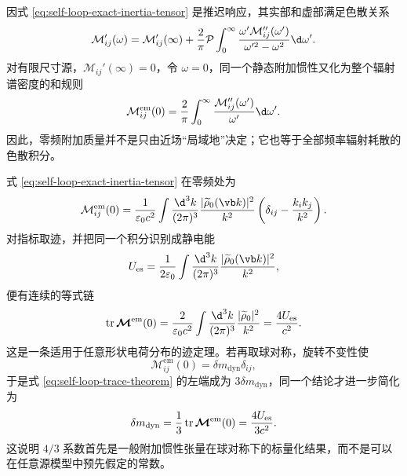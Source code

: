 因式 \eqref{eq:self-loop-exact-inertia-tensor} 是推迟响应，其实部和虚部满足色散关系
\begin{equation}
 \mathcal M_{ij}'(\omega)
 =\mathcal M_{ij}'(\infty)
 +{2\over\pi}\mathcal P\int_0^\infty
 {\omega'\mathcal M_{ij}''(\omega')\over\omega'^2-\omega^2}\d\omega'.
 \label{eq:self-loop-KK}
\end{equation}
对有限尺寸源，$\mathcal M_{ij}'(\infty)=0$，令 $\omega=0$，同一个静态附加惯性又化为整个辐射谱密度的和规则
\begin{equation}
 \mathcal M_{ij}^{\mathrm{em}}(0)
 ={2\over\pi}\int_0^\infty
 {\mathcal M_{ij}''(\omega')\over\omega'}\d\omega'.
 \label{eq:self-loop-added-mass-sum-rule}
\end{equation}
因此，零频附加质量并不是只由近场“局域地”决定；它也等于全部频率辐射耗散的色散积分。

式 \eqref{eq:self-loop-exact-inertia-tensor} 在零频处为
\begin{equation}
 \mathcal M_{ij}^{\mathrm{em}}(0)
 ={1\over\varepsilon_0c^2}
 \int{\d^3k\over(2\pi)^3}
 {|\widetilde\rho_0(\vb k)|^2\over k^2}
 \left(\delta_{ij}-{k_i k_j\over k^2}\right).
 \label{eq:self-loop-static-tensor}
\end{equation}
对指标取迹，并把同一个积分识别成静电能
\begin{equation*}
 U_{\mathrm{es}}
 ={1\over2\varepsilon_0}
 \int{\d^3k\over(2\pi)^3}{|\widetilde\rho_0(\vb k)|^2\over k^2},
\end{equation*}
便有连续的等式链
\begin{equation}
 \operatorname{tr}\boldsymbol{\mathcal M}^{\mathrm{em}}(0)
 ={2\over\varepsilon_0c^2}
 \int{\d^3k\over(2\pi)^3}{|\widetilde\rho_0|^2\over k^2}
 ={4U_{\mathrm{es}}\over c^2}.
 \label{eq:self-loop-trace-theorem}
\end{equation}
这是一条适用于任意形状电荷分布的迹定理。若再取球对称，旋转不变性使
\begin{equation*}
 \mathcal M_{ij}^{\mathrm{em}}(0)=\delta m_{\mathrm{dyn}}\delta_{ij},
\end{equation*}
于是式 \eqref{eq:self-loop-trace-theorem} 的左端成为 $3\delta m_{\mathrm{dyn}}$，同一个结论才进一步简化为
\begin{equation}
 \delta m_{\mathrm{dyn}}
 ={1\over3}\operatorname{tr}\boldsymbol{\mathcal M}^{\mathrm{em}}(0)
 ={4U_{\mathrm{es}}\over3c^2}.
 \label{eq:self-loop-four-thirds-mass}
\end{equation}
这说明 $4/3$ 系数首先是一般附加惯性张量在球对称下的标量化结果，而不是可以在任意源模型中预先假定的常数。


